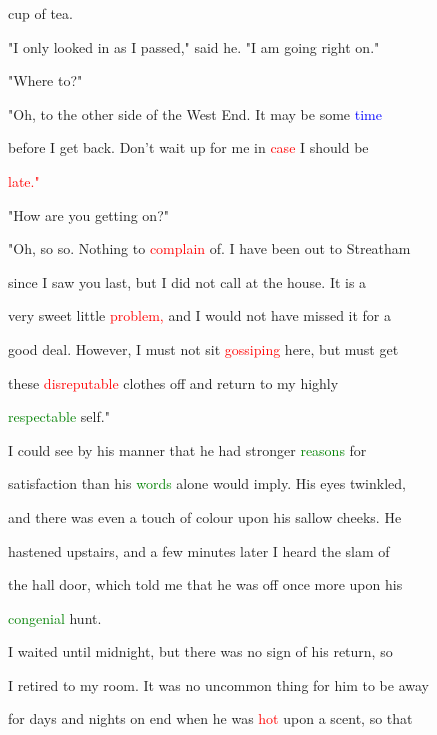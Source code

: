  cup of tea.



 "I only looked in as I passed," said he. "I am going right on."



 "Where to?"



 "Oh, to the other side of the West End. It may be some \textcolor{blue}{time}

 before I get back. Don't \textcolor{BurntOrange}{wait} up for me in \textcolor{red}{case} I should be

 \textcolor{red}{late."}



 "How are you getting on?"



 "Oh, so so. Nothing to \textcolor{red}{complain} of. I have been out to Streatham

 since I saw you last, but I did not call at the house. It is a

 very \textcolor{BurntOrange}{sweet} little \textcolor{red}{problem,} and I would not have missed it for a

 \textcolor{BurntOrange}{good} \textcolor{BurntOrange}{deal.} However, I must not sit \textcolor{red}{gossiping} here, but must get

 these \textcolor{red}{disreputable} clothes off and return to my highly

 \textcolor{green}{respectable} self."



 I could see by his manner that he had stronger \textcolor{green}{reasons} for

 satisfaction than his \textcolor{green}{words} alone would imply. His eyes \textcolor{BurntOrange}{twinkled,}

 and there was even a touch of colour upon his sallow cheeks. He

 hastened upstairs, and a few minutes later I heard the \textcolor{BurntOrange}{slam} of

 the hall door, which told me that he was off once more upon his

 \textcolor{green}{congenial} hunt.



 I \textcolor{BurntOrange}{waited} until midnight, but there was no sign of his return, so

 I retired to my room. It was no uncommon thing for him to be away

 for days and nights on end when he was \textcolor{red}{hot} upon a scent, so that

